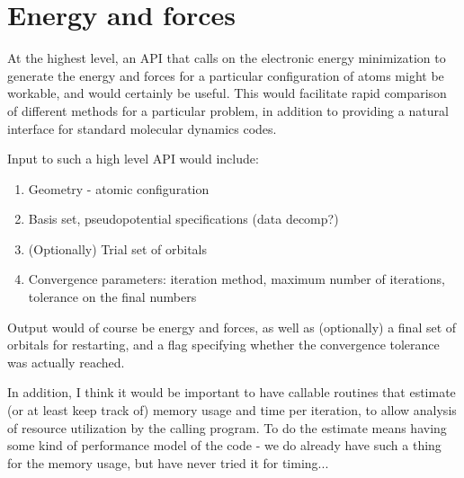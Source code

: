\section{Energy and forces}

At the highest level, an API that calls on the electronic
energy minimization to generate the energy and forces for a particular
configuration of atoms might be workable, and would certainly be
useful. This would facilitate rapid comparison of different methods
for a particular problem, in addition to providing a natural interface
for standard molecular dynamics codes.

Input to such a high level API would include:
\begin{enumerate}
\item Geometry - atomic configuration
\item Basis set, pseudopotential specifications (data decomp?)
\item (Optionally) Trial set of orbitals
\item Convergence parameters: iteration method, maximum number of
iterations, tolerance on the final numbers
\end{enumerate}

Output would of course be energy and forces, as well as
(optionally) a final set of orbitals for restarting, and a flag
specifying whether the convergence tolerance was actually reached.

In addition, I think it would be important to have callable
routines that estimate (or at least keep track of) memory usage
and time per iteration, to allow analysis of resource utilization
by the calling program. To do the estimate means having some kind
of performance model of the code - we do already have such a thing
for the memory usage, but have never tried it for timing...


\bye
